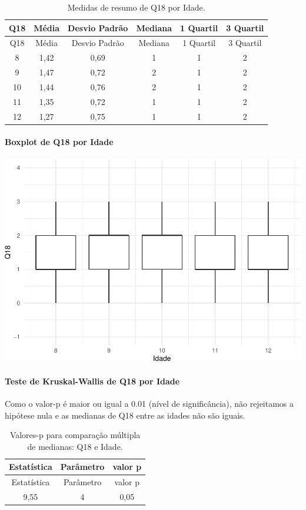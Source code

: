 \documentclass[]{article}
\let\oldparagraph\paragraph
\renewcommand{\paragraph}[1]{\oldparagraph{#1}\mbox{}}
\begin{document}
\begin{longtable}[]{@{}cccccc@{}}
\caption{\label{tab:unnamed-chunk-272}Medidas de resumo de Q18 por Idade.}\tabularnewline
\toprule
Q18 & Média & Desvio Padrão & Mediana & 1 Quartil & 3 Quartil\tabularnewline
\midrule
\endfirsthead
\toprule
Q18 & Média & Desvio Padrão & Mediana & 1 Quartil & 3 Quartil\tabularnewline
\midrule
\endhead
8 & 1,42 & 0,69 & 1 & 1 & 2\tabularnewline
9 & 1,47 & 0,72 & 2 & 1 & 2\tabularnewline
10 & 1,44 & 0,76 & 2 & 1 & 2\tabularnewline
11 & 1,35 & 0,72 & 1 & 1 & 2\tabularnewline
12 & 1,27 & 0,75 & 1 & 1 & 2\tabularnewline
\bottomrule
\end{longtable}

\hypertarget{boxplot-de-q18-por-idade}{%
\paragraph{Boxplot de Q18 por Idade}\label{boxplot-de-q18-por-idade}}

\begin{center}\includegraphics[width=0.75\linewidth]{relatorio_covid19_files/figure-latex/unnamed-chunk-273-1} \end{center}

\hypertarget{teste-de-kruskal-wallis-de-q18-por-idade}{%
\paragraph{Teste de Kruskal-Wallis de Q18 por Idade}\label{teste-de-kruskal-wallis-de-q18-por-idade}}

Como o valor-p é maior ou igual a 0.01 (nível de significância), não rejeitamos a hipótese nula e as medianas de Q18 entre as idades não são iguais.

\begin{longtable}[]{@{}ccc@{}}
\caption{\label{tab:unnamed-chunk-275}Valores-p para comparação múltipla de medianas: Q18 e Idade.}\tabularnewline
\toprule
Estatística & Parâmetro & valor p\tabularnewline
\midrule
\endfirsthead
\toprule
Estatística & Parâmetro & valor p\tabularnewline
\midrule
\endhead
9,55 & 4 & 0,05\tabularnewline
\bottomrule
\end{longtable}
\end{document}
